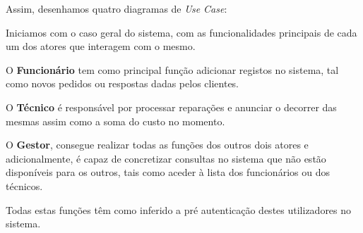 \documentclass{article}
\begin{document}
\begin{table}[H]
\centering
{}
\caption{Entidades do sistema com os respetivos \textit{Use Case}}
\end{table}




Assim, desenhamos quatro diagramas de \textit{Use Case}: 

\par Iniciamos com o caso geral do sistema, com as funcionalidades principais de cada um dos atores que interagem com o mesmo. 
\par O \textbf{Funcionário} tem como principal função adicionar registos no sistema, tal como novos pedidos ou respostas dadas pelos clientes.
\par O \textbf{Técnico} é responsável por processar reparações e anunciar o decorrer das mesmas assim como a soma do custo no momento.
\par O \textbf{Gestor}, consegue realizar todas as funções dos outros dois atores e adicionalmente, é capaz de concretizar consultas no sistema que não estão disponíveis para os outros, tais como aceder à lista dos funcionários ou dos técnicos.
\par Todas estas funções têm como inferido a pré autenticação destes utilizadores no sistema.
\end{document}
